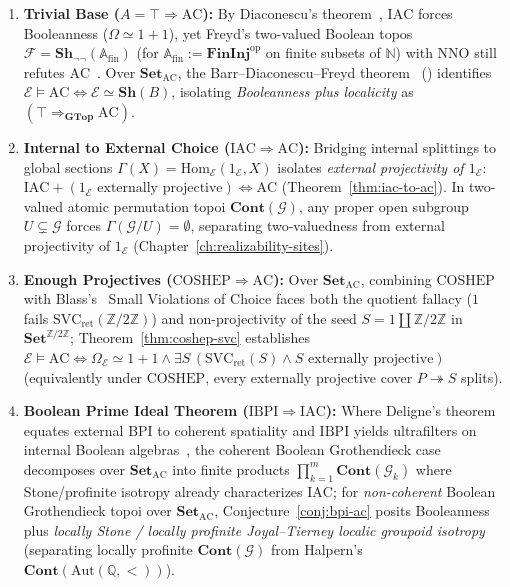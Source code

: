 \begin{enumerate}
  \item \textbf{Trivial Base ($A = \top \Rightarrow \mathrm{AC}$):} By Diaconescu's theorem~\cite{Diaconescu75}, $\mathrm{IAC}$ forces Booleanness ($\Omega \simeq 1+1$), yet Freyd's two-valued Boolean topos $\mathcal{F} = \mathbf{Sh}_{\neg\neg}(\mathbb{A}_{\mathrm{fin}})$ (for $\mathbb{A}_{\mathrm{fin}} := \mathbf{FinInj}^{\mathrm{op}}$ on finite subsets of $\mathbb{N}$) with $\mathrm{NNO}$ still refutes $\mathrm{AC}$~\cite{Freyd72}. Over $\mathbf{Set}_{\mathrm{AC}}$, the Barr--Diaconescu--Freyd theorem~\cite{Barr74,Diaconescu75,Freyd72} (\cite[\S D4.5]{Johnstone02}) identifies $\mathcal{E} \models \mathrm{AC} \iff \mathcal{E} \simeq \mathbf{Sh}(B)$, isolating \emph{Booleanness plus localicity} as $(\top \Rightarrow_{\mathbf{GTop}} \mathrm{AC})$.
  \item \textbf{Internal to External Choice ($\mathrm{IAC} \Rightarrow \mathrm{AC}$):} Bridging internal splittings to global sections $\Gamma(X) = \mathrm{Hom}_{\mathcal{E}}(1_{\mathcal{E}}, X)$ isolates \emph{external projectivity of $1_{\mathcal{E}}$}: $\mathrm{IAC} + (1_{\mathcal{E}} \text{ externally projective}) \iff \mathrm{AC}$ (Theorem~\ref{thm:iac-to-ac}). In two-valued atomic permutation topoi $\mathbf{Cont}(\mathcal{G})$, any proper open subgroup $U \subsetneq \mathcal{G}$ forces $\Gamma(\mathcal{G}/U) = \emptyset$, separating two-valuedness from external projectivity of $1_{\mathcal{E}}$ (Chapter~\ref{ch:realizability-sites}).
  \item \textbf{Enough Projectives ($\mathrm{COSHEP} \Rightarrow \mathrm{AC}$):} Over $\mathbf{Set}_{\mathrm{AC}}$, combining $\mathrm{COSHEP}$ with Blass's~\cite{Blass79} Small Violations of Choice faces both the quotient fallacy ($1$ fails $\mathrm{SVC}_{\mathrm{ret}}(\mathbb{Z}/2\mathbb{Z})$) and non-projectivity of the seed $S = 1 \amalg \mathbb{Z}/2\mathbb{Z}$ in $\mathbf{Set}^{\mathbb{Z}/2\mathbb{Z}}$; Theorem~\ref{thm:coshep-svc} establishes $\mathcal{E} \models \mathrm{AC} \iff \Omega_{\mathcal{E}} \simeq 1+1 \wedge \exists S\,(\mathrm{SVC}_{\mathrm{ret}}(S) \wedge S \text{ externally projective})$ (equivalently under $\mathrm{COSHEP}$, every externally projective cover $P \twoheadrightarrow S$ splits).
  \item \textbf{Boolean Prime Ideal Theorem ($\mathrm{IBPI} \Rightarrow \mathrm{IAC}$):} Where Deligne's theorem~\cite[Exp.~VI, Appendice]{Deligne72} equates external $\mathrm{BPI}$ to coherent spatiality and $\mathrm{IBPI}$ yields ultrafilters on internal Boolean algebras~\cite{Johnstone82,Johnstone02}, the coherent Boolean Grothendieck case decomposes over $\mathbf{Set}_{\mathrm{AC}}$ into finite products $\prod_{k=1}^m \mathbf{Cont}(\mathcal{G}_k)$ where Stone/profinite isotropy already characterizes $\mathrm{IAC}$; for \emph{non-coherent} Boolean Grothendieck topoi over $\mathbf{Set}_{\mathrm{AC}}$, Conjecture~\ref{conj:bpi-ac} posits Booleanness plus \emph{locally Stone / locally profinite Joyal--Tierney localic groupoid isotropy} (separating locally profinite $\mathbf{Cont}(\mathcal{G})$ from Halpern's $\mathbf{Cont}(\mathrm{Aut}(\mathbb{Q}, <))$).

\end{enumerate}
